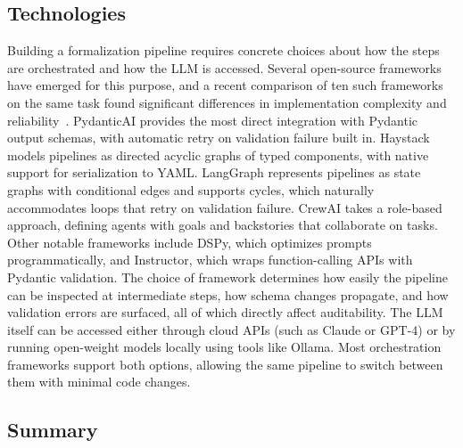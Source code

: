\subsection{Technologies}
\label{sec:sota-tech}

Building a formalization pipeline requires concrete choices about how the
steps are orchestrated and how the LLM is accessed. Several open-source
frameworks have emerged for this purpose, and a recent comparison of ten
such frameworks on the same task found significant differences in
implementation complexity and
reliability~\cite{ahmed2026ddl2propbank}. PydanticAI provides the most
direct integration with Pydantic output schemas, with automatic retry on
validation failure built in. Haystack models pipelines as directed acyclic
graphs of typed components, with native support for serialization to YAML.
LangGraph represents pipelines as state graphs with conditional edges and
supports cycles, which naturally accommodates loops that retry on
validation failure. CrewAI takes a role-based approach, defining agents
with goals and backstories that collaborate on tasks. Other notable
frameworks include DSPy, which optimizes prompts programmatically, and
Instructor, which wraps function-calling APIs with Pydantic validation.
The choice of framework determines how easily the pipeline can be
inspected at intermediate steps, how schema changes propagate, and how
validation errors are surfaced, all of which directly affect auditability.
The LLM itself can be accessed either through cloud APIs (such as Claude
or GPT-4) or by running open-weight models locally using tools like
Ollama. Most orchestration frameworks support both options, allowing the
same pipeline to switch between them with minimal code changes.

\subsection*{Summary}


